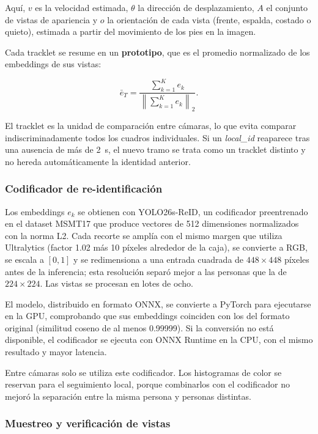 \documentclass[12pt,a4paper]{article}
\begin{document}
Aquí, $v$ es la velocidad estimada, $\theta$ la dirección de
desplazamiento, $A$ el conjunto de vistas de apariencia y $o$ la
orientación de cada vista (frente, espalda, costado o quieto), estimada a
partir del movimiento de los pies en la imagen.

Cada tracklet se resume en un \textbf{prototipo}, que es el promedio
normalizado de los embeddings de sus vistas:

\begin{equation}
\bar{e}_T=
\frac{\sum_{k=1}^{K} e_k}
{\left\|\sum_{k=1}^{K} e_k\right\|_2}.
\end{equation}

El tracklet es la unidad de comparación entre cámaras, lo que evita
comparar indiscriminadamente todos los cuadros individuales. Si un
\textit{local\_id} reaparece tras una ausencia de más de 2~s, el nuevo
tramo se trata como un tracklet distinto y no hereda automáticamente la
identidad anterior.

\subsubsection{Codificador de re-identificación}

Los embeddings $e_k$ se obtienen con YOLO26s-ReID, un codificador
preentrenado en el dataset MSMT17 que produce vectores de 512
dimensiones normalizados con la norma L2. Cada recorte se amplía con el
mismo margen que utiliza Ultralytics (factor 1.02 más 10 píxeles
alrededor de la caja), se convierte a RGB, se escala a $[0,1]$ y se
redimensiona a una entrada cuadrada de $448\times448$ píxeles antes de
la inferencia; esta resolución separó mejor a las personas que la de
$224\times224$. Las vistas se procesan en lotes de ocho.

El modelo, distribuido en formato ONNX, se convierte a PyTorch para
ejecutarse en la GPU, comprobando que sus embeddings coinciden con los
del formato original (similitud coseno de al menos 0.99999). Si la
conversión no está disponible, el codificador se ejecuta con ONNX
Runtime en la CPU, con el mismo resultado y mayor latencia.

Entre cámaras solo se utiliza este codificador. Los histogramas de color
se reservan para el seguimiento local, porque combinarlos con el
codificador no mejoró la separación entre la misma persona y personas
distintas.

\subsubsection{Muestreo y verificación de vistas}
\end{document}
